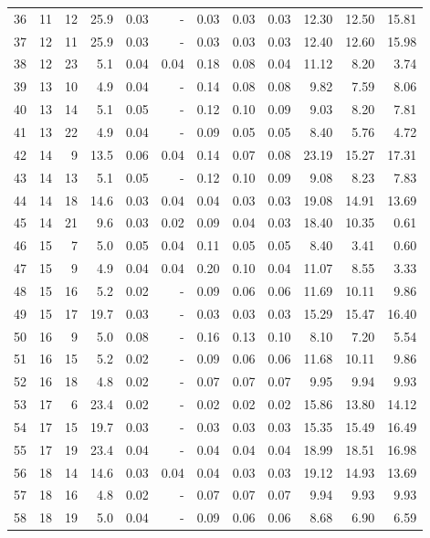 \begin{small}
\begin{longtable}[c]{lrrrrr|rrr|rrr}
36 & 11 & 12 & 25.9 & 0.03 & - & 0.03 & 0.03 & 0.03 & 12.30 & 12.50 & 15.81 \\
37 & 12 & 11 & 25.9 & 0.03 & - & 0.03 & 0.03 & 0.03 & 12.40 & 12.60 & 15.98 \\
38 & 12 & 23 & 5.1 & 0.04 & 0.04 & 0.18 & 0.08 & 0.04 & 11.12 & 8.20 & 3.74 \\
39 & 13 & 10 & 4.9 & 0.04 & - & 0.14 & 0.08 & 0.08 & 9.82 & 7.59 & 8.06 \\
40 & 13 & 14 & 5.1 & 0.05 & - & 0.12 & 0.10 & 0.09 & 9.03 & 8.20 & 7.81 \\
41 & 13 & 22 & 4.9 & 0.04 & - & 0.09 & 0.05 & 0.05 & 8.40 & 5.76 & 4.72 \\
42 & 14 & 9 & 13.5 & 0.06 & 0.04 & 0.14 & 0.07 & 0.08 & 23.19 & 15.27 & 17.31 \\
43 & 14 & 13 & 5.1 & 0.05 & - & 0.12 & 0.10 & 0.09 & 9.08 & 8.23 & 7.83 \\
44 & 14 & 18 & 14.6 & 0.03 & 0.04 & 0.04 & 0.03 & 0.03 & 19.08 & 14.91 & 13.69 \\
45 & 14 & 21 & 9.6 & 0.03 & 0.02 & 0.09 & 0.04 & 0.03 & 18.40 & 10.35 & 0.61 \\
46 & 15 & 7 & 5.0 & 0.05 & 0.04 & 0.11 & 0.05 & 0.05 & 8.40 & 3.41 & 0.60 \\
47 & 15 & 9 & 4.9 & 0.04 & 0.04 & 0.20 & 0.10 & 0.04 & 11.07 & 8.55 & 3.33 \\
48 & 15 & 16 & 5.2 & 0.02 & - & 0.09 & 0.06 & 0.06 & 11.69 & 10.11 & 9.86 \\
49 & 15 & 17 & 19.7 & 0.03 & - & 0.03 & 0.03 & 0.03 & 15.29 & 15.47 & 16.40 \\
50 & 16 & 9 & 5.0 & 0.08 & - & 0.16 & 0.13 & 0.10 & 8.10 & 7.20 & 5.54 \\
51 & 16 & 15 & 5.2 & 0.02 & - & 0.09 & 0.06 & 0.06 & 11.68 & 10.11 & 9.86 \\
52 & 16 & 18 & 4.8 & 0.02 & - & 0.07 & 0.07 & 0.07 & 9.95 & 9.94 & 9.93 \\
53 & 17 & 6 & 23.4 & 0.02 & - & 0.02 & 0.02 & 0.02 & 15.86 & 13.80 & 14.12 \\
54 & 17 & 15 & 19.7 & 0.03 & - & 0.03 & 0.03 & 0.03 & 15.35 & 15.49 & 16.49 \\
55 & 17 & 19 & 23.4 & 0.04 & - & 0.04 & 0.04 & 0.04 & 18.99 & 18.51 & 16.98 \\
56 & 18 & 14 & 14.6 & 0.03 & 0.04 & 0.04 & 0.03 & 0.03 & 19.12 & 14.93 & 13.69 \\
57 & 18 & 16 & 4.8 & 0.02 & - & 0.07 & 0.07 & 0.07 & 9.94 & 9.93 & 9.93 \\
58 & 18 & 19 & 5.0 & 0.04 & - & 0.09 & 0.06 & 0.06 & 8.68 & 6.90 & 6.59 \\

\end{longtable}
\end{small}

